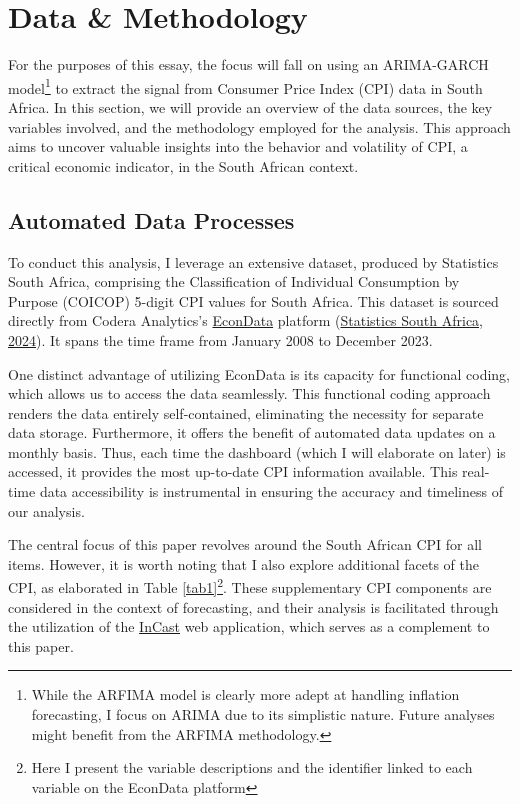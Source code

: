 \documentclass[11pt,preprint, authoryear]{elsarticle}
\numberwithin{equation}{section}
\numberwithin{figure}{section}
\numberwithin{table}{section}
\let\rmarkdownfootnote\footnote%
\def\footnote{\protect\rmarkdownfootnote}
\begin{document}
\hypertarget{data-methodology}{%
\section{\texorpdfstring{Data \& Methodology
\label{Meth}}{Data \& Methodology }}\label{data-methodology}}

For the purposes of this essay, the focus will fall on using an
ARIMA-GARCH model\footnote{While the ARFIMA model is clearly more adept
  at handling inflation forecasting, I focus on ARIMA due to its
  simplistic nature. Future analyses might benefit from the ARFIMA
  methodology.} to extract the signal from Consumer Price Index (CPI)
data in South Africa. In this section, we will provide an overview of
the data sources, the key variables involved, and the methodology
employed for the analysis. This approach aims to uncover valuable
insights into the behavior and volatility of CPI, a critical economic
indicator, in the South African context.

\hypertarget{automated-data-processes}{%
\subsection{Automated Data Processes}\label{automated-data-processes}}

To conduct this analysis, I leverage an extensive dataset, produced by
Statistics South Africa, comprising the Classification of Individual
Consumption by Purpose (COICOP) 5-digit CPI values for South Africa.
This dataset is sourced directly from Codera Analytics's
\href{https://www.econdata.co.za/app}{EconData} platform
(\protect\hyperlink{ref-data}{Statistics South Africa, 2024}). It spans
the time frame from January 2008 to December 2023.

One distinct advantage of utilizing EconData is its capacity for
functional coding, which allows us to access the data seamlessly. This
functional coding approach renders the data entirely self-contained,
eliminating the necessity for separate data storage. Furthermore, it
offers the benefit of automated data updates on a monthly basis. Thus,
each time the dashboard (which I will elaborate on later) is accessed,
it provides the most up-to-date CPI information available. This
real-time data accessibility is instrumental in ensuring the accuracy
and timeliness of our analysis.

The central focus of this paper revolves around the South African CPI
for all items. However, it is worth noting that I also explore
additional facets of the CPI, as elaborated in Table
\ref{tab1}\footnote{Here I present the variable descriptions and the
  identifier linked to each variable on the EconData platform}. These
supplementary CPI components are considered in the context of
forecasting, and their analysis is facilitated through the utilization
of the \href{https://janpretorius.shinyapps.io/incast/}{InCast} web
application, which serves as a complement to this paper.
\end{document}
